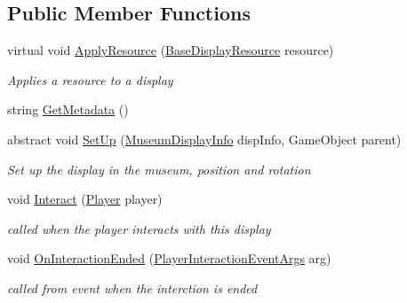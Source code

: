 \subsection*{Public Member Functions}
\begin{DoxyCompactItemize}
\item 
virtual void \mbox{\hyperlink{class_display_a811157ddb42ae4d72f690457a08711d3}{Apply\+Resource}} (\mbox{\hyperlink{class_base_display_resource}{Base\+Display\+Resource}} resource)
\begin{DoxyCompactList}\small\item\em Applies a resource to a display \end{DoxyCompactList}\item 
string \mbox{\hyperlink{class_display_a293687a976cbe23a09b7c6ddef36a48d}{Get\+Metadata}} ()
\item 
abstract void \mbox{\hyperlink{class_display_a57325251fbeac943cd48520e50f0bec4}{Set\+Up}} (\mbox{\hyperlink{class_museum_display_info}{Museum\+Display\+Info}} disp\+Info, Game\+Object parent)
\begin{DoxyCompactList}\small\item\em Set up the display in the museum, position and rotation \end{DoxyCompactList}\item 
void \mbox{\hyperlink{class_display_a43fc2a6f19bbf2f1bdb676392b37e921}{Interact}} (\mbox{\hyperlink{class_player}{Player}} player)
\begin{DoxyCompactList}\small\item\em called when the player interacts with this display \end{DoxyCompactList}\item 
void \mbox{\hyperlink{class_display_a29f45efdf15e97219d2c8a614d699da8}{On\+Interaction\+Ended}} (\mbox{\hyperlink{class_player_interaction_event_args}{Player\+Interaction\+Event\+Args}} arg)
\begin{DoxyCompactList}\small\item\em called from event when the interction is ended \end{DoxyCompactList}\end{DoxyCompactItemize}
